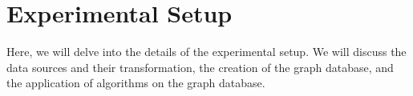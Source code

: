\section{Experimental Setup} \label{sec:experimental-setup}

Here, we will delve into the details of the experimental setup.
We will discuss the data sources and their transformation, the creation of the graph database,
and the application of algorithms on the graph database.







